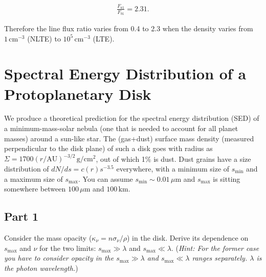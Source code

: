 \documentclass[12pt]{article}
\begin{document}
\begin{align*}
\boxed{ \frac{F_{a1}}{F_{b1}} = 2.31 }.
\end{align*}

Therefore the line flux ratio varies from 0.4 to 2.3 when the density varies from $1\,\mathrm{cm^{-3}}$ (NLTE) to $10^5\,\mathrm{cm^{-3}}$ (LTE).


\section{Spectral Energy Distribution of a Protoplanetary Disk}

We produce a theoretical prediction for the spectral energy distribution (SED) of a minimum-mass-solar nebula (one that is needed to account for all planet masses) around a sun-like star. The (gas+dust) surface mass density (measured perpendicular to the disk plane) of such a disk goes with radius as $\Sigma = 1700(r/\mathrm{AU})^{-3/2}\,\mathrm{g/cm^2}$, out of which 1\% is dust. Dust grains have a size distribution of $dN/ds = c(r)s^{-3.5}$ everywhere, with a minimum size of $s_\mathrm{min}$ and a maximum size of $s_\mathrm{max}$. You can assume $s_\mathrm{min} \sim 0.01\,\mu\mathrm{m}$ and $s_\mathrm{max}$ is sitting somewhere between $100\,\mu\mathrm{m}$ and $100\,\mathrm{km}$.


\subsection*{Part 1}

Consider the mass opacity ($\kappa_\nu = n\sigma_\nu/\rho$) in the disk. Derive its dependence on $s_\mathrm{max}$ and $\nu$ for the two limits: $s_\mathrm{max} \gg \lambda$ and $s_\mathrm{max} \ll \lambda $. (\textit{Hint: For the former case you have to consider opacity in the $s_\mathrm{max} \gg \lambda$ and $s_\mathrm{max} \ll \lambda$ ranges separately. $\lambda$ is the photon wavelength.})

\end{document}

